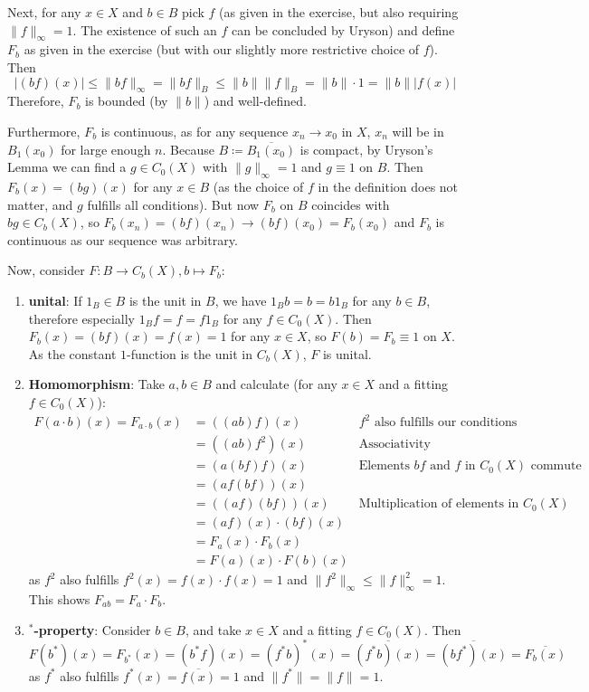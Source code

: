 \documentclass[a4paper]{article}
\begin{document}
 Next, for any $x \in X$ and $b \in B$ pick $f$ (as given in the exercise, but also requiring $\|f\|_\infty = 1$. The existence of such an $f$ can be concluded by Uryson) and define $F_b$ as given in the exercise (but with our slightly more restrictive choice of $f$). Then
 \begin{equation*}
    |(bf)(x)| \leq \| bf \|_\infty = \| bf \|_B \leq \|b\| \|f\|_B = \|b\| \cdot 1 = \|b\| |f(x)|
 \end{equation*}
 Therefore, $F_b$ is bounded (by $\|b\|$) and well-defined.

 Furthermore, $F_b$ is continuous, as for any sequence $x_n \to x_0$ in $X$, $x_n$ will be in $B_1(x_0)$ for large enough $n$.
 Because $B \coloneq \overline{B_1(x_0)}$ is compact, by Uryson's Lemma we can find a $g \in C_0(X)$ with $\|g\|_\infty = 1$ and $g \equiv 1$ on $B$.
 Then $F_b(x) = (bg)(x)$ for any $x \in B$ (as the choice of $f$ in the definition does not matter, and $g$ fulfills all conditions).
 But now $F_b$ on $B$ coincides with $bg \in C_b(X)$, so $F_b(x_n) = (bf)(x_n) \to (bf)(x_0) = F_b(x_0)$ and $F_b$ is continuous as our sequence was arbitrary.

 Now, consider $F: B \to C_b(X), b \mapsto F_b$:
 \begin{enumerate}
    \item \textbf{unital}: If $1_B \in B$ is the unit in $B$, we have $1_B b = b = b 1_B$ for any $b \in B$, therefore especially $1_B f = f = f 1_B$ for any $f \in C_0(X)$.
    Then $F_b(x) = (bf)(x) = f(x) = 1$ for any $x \in X$, so $F(b) = F_b \equiv 1$ on $X$.
    As the constant $1$-function is the unit in $C_b(X)$, $F$ is unital.
    \item \textbf{Homomorphism}: Take $a,b \in B$ and calculate (for any $x \in X$ and a fitting $f \in C_0(X)$):
    \begin{align*}
        F(a \cdot b)(x) = F_{a \cdot b}(x) &= ((a b) f)(x) & \text{$f^2$ also fulfills our conditions}\\
        &= ((a b) f^2)(x) &\text{Associativity} \\
        &= (a (bf) f)(x) &\text{Elements $bf$ and $f$ in $C_0(X)$ commute}\\
        &= (a f (bf))(x)\\ &= ((af)(bf))(x) &\text{Multiplication of elements in $C_0(X)$} \\
        &= (af)(x) \cdot (bf)(x) \\ &= F_a(x) \cdot F_b(x) \\ &= F(a)(x) \cdot F(b)(x)
    \end{align*}
    as $f^2$ also fulfills $f^2(x) = f(x) \cdot f(x) = 1$ and $\|f^2\|_\infty \leq \|f\|_\infty^2 = 1$. This shows $F_{ab} = F_a \cdot F_b$.
    \item \textbf{$^*$-property}: Consider $b \in B$, and take $x \in X$ and a fitting $f \in C_0(X)$. Then
    \begin{equation*}
        F(b^*)(x) = F_{b^*}(x) = (b^* f)(x) = (f^* b)^*(x) = \overline{(f^* b)(x)} = \overline{(b f^*)(x)} = \overline{F_b(x)}
    \end{equation*}
    as $f^*$ also fulfills $f^*(x) = \overline{f(x)} = 1$ and $\|f^*\| = \|f\| = 1$.
 \end{enumerate}
\end{document}
